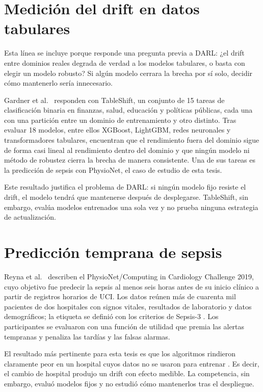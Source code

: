 \section{Medición del drift en datos tabulares}
\label{sec:lit_benchmark}

Esta línea se incluye porque responde una pregunta previa a DARL: ¿el drift entre dominios
reales degrada de verdad a los modelos tabulares, o basta con elegir un modelo robusto? Si
algún modelo cerrara la brecha por sí solo, decidir cómo mantenerlo sería innecesario.

Gardner et al.~\cite{gardner2023tableshift} responden con TableShift, un conjunto de 15
tareas de clasificación binaria en finanzas, salud, educación y políticas públicas, cada
una con una partición entre un dominio de entrenamiento y otro distinto. Tras evaluar 18
modelos, entre ellos XGBoost, LightGBM, redes neuronales y transformadores tabulares,
encuentran que el rendimiento fuera del dominio sigue de forma casi lineal al rendimiento
dentro del dominio y que ningún modelo ni método de robustez cierra la brecha de manera
consistente. Una de sus tareas es la predicción de sepsis con PhysioNet, el caso de estudio
de esta tesis.

Este resultado justifica el problema de DARL: si ningún modelo fijo resiste el drift, el
modelo tendrá que mantenerse después de desplegarse. TableShift, sin embargo, evalúa modelos
entrenados una sola vez y no prueba ninguna estrategia de actualización.

\section{Predicción temprana de sepsis}
\label{sec:lit_sepsis}

Reyna et al.~\cite{reyna2020sepsis} describen el PhysioNet/Computing in Cardiology Challenge
2019, cuyo objetivo fue predecir la sepsis al menos seis horas antes de su inicio clínico a
partir de registros horarios de UCI. Los datos reúnen más de cuarenta mil pacientes de dos
hospitales con signos vitales, resultados de laboratorio y datos demográficos; la etiqueta
se definió con los criterios de Sepsis-3 \cite{singer2016sepsis3}. Los participantes se
evaluaron con una función de utilidad que premia las alertas tempranas y penaliza las
tardías y las falsas alarmas.

El resultado más pertinente para esta tesis es que los algoritmos rindieron claramente peor
en un hospital cuyos datos no se usaron para entrenar \cite{reyna2020sepsis}. Es decir, el
cambio de hospital produjo un drift con efecto medible. La competencia, sin embargo, evaluó
modelos fijos y no estudió cómo mantenerlos tras el despliegue.

